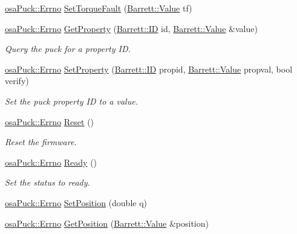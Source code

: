 \begin{DoxyCompactItemize}
\hyperlink{classosa_puck_af19c88d20083577d3a676353b4902391}{osa\+Puck\+::\+Errno} \hyperlink{classosa_puck_ad92b10c2520e7c1334819db2ed601279}{Set\+Torque\+Fault} (\hyperlink{struct_barrett_a57ff132885344ca62e4b4b691885685b}{Barrett\+::\+Value} tf)
\item 
\hyperlink{classosa_puck_af19c88d20083577d3a676353b4902391}{osa\+Puck\+::\+Errno} \hyperlink{classosa_puck_a565ea9b07a99c8474ef5edaf8231109a}{Get\+Property} (\hyperlink{struct_barrett_a317dfaed9982ffc28166e537d774bd16}{Barrett\+::\+I\+D} id, \hyperlink{struct_barrett_a57ff132885344ca62e4b4b691885685b}{Barrett\+::\+Value} \&value)
\begin{DoxyCompactList}\small\item\em Query the puck for a property I\+D. \end{DoxyCompactList}\item 
\hyperlink{classosa_puck_af19c88d20083577d3a676353b4902391}{osa\+Puck\+::\+Errno} \hyperlink{classosa_puck_a0fc97b9e3d7c17f4825339dc38ad36fc}{Set\+Property} (\hyperlink{struct_barrett_a317dfaed9982ffc28166e537d774bd16}{Barrett\+::\+I\+D} propid, \hyperlink{struct_barrett_a57ff132885344ca62e4b4b691885685b}{Barrett\+::\+Value} propval, bool verify)
\begin{DoxyCompactList}\small\item\em Set the puck property I\+D to a value. \end{DoxyCompactList}\item 
\hyperlink{classosa_puck_af19c88d20083577d3a676353b4902391}{osa\+Puck\+::\+Errno} \hyperlink{classosa_puck_a2722885c5061ff2e2df5bb7561bf2e58}{Reset} ()
\begin{DoxyCompactList}\small\item\em Reset the firmware. \end{DoxyCompactList}\item 
\hyperlink{classosa_puck_af19c88d20083577d3a676353b4902391}{osa\+Puck\+::\+Errno} \hyperlink{classosa_puck_a29e797d17705c22ae9a5fcb4bd5f5893}{Ready} ()
\begin{DoxyCompactList}\small\item\em Set the status to ready. \end{DoxyCompactList}\item 
\hyperlink{classosa_puck_af19c88d20083577d3a676353b4902391}{osa\+Puck\+::\+Errno} \hyperlink{classosa_puck_a33d4b04d1ab8d833dd6b57b8132e8069}{Set\+Position} (double q)
\item 
\hyperlink{classosa_puck_af19c88d20083577d3a676353b4902391}{osa\+Puck\+::\+Errno} \hyperlink{classosa_puck_a4a94604727697e92f46712265a408989}{Get\+Position} (\hyperlink{struct_barrett_a57ff132885344ca62e4b4b691885685b}{Barrett\+::\+Value} \&position)

\end{DoxyCompactItemize}
